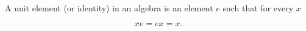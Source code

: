 A unit element (or identity) in an algebra is an element $e$ such that for every $x$

$$xe = ex = x.$$
